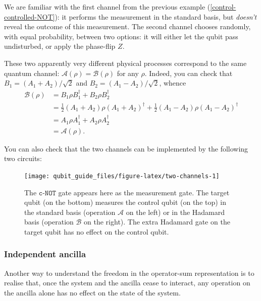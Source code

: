 \documentclass[fleqn,a4paper]{article}
\theoremstyle{definition}
\theoremstyle{definition}
\theoremstyle{definition}
\theoremstyle{definition}
\theoremstyle{remark}
\begin{document}
We are familiar with the first channel from the previous example (\ref{control-controlled-NOT}): it performs the measurement in the standard basis, but \emph{doesn't} reveal the outcome of this measurement.
The second channel chooses randomly, with equal probability, between two options: it will either let the qubit pass undisturbed, or apply the phase-flip \(Z\).

These two apparently very different physical processes correspond to the same quantum channel: \(\mathcal{A}(\rho)=\mathcal{B}(\rho)\) for any \(\rho\).
Indeed, you can check that \(B_1=(A_1+A_2)/\sqrt{2}\) and \(B_2=(A_1-A_2)/\sqrt{2}\), whence
\[
  \begin{aligned}
    \mathcal{B}(\rho)
    &= B_1\rho B_1^\dagger + B_2\rho B_2^\dagger
  \\&= \frac{1}{2} (A_1+A_2)\rho (A_1+A_2)^\dagger + \frac{1}{2} (A_1-A_2)\rho (A_1-A_2)^\dagger
  \\&=  A_1\rho A_1^\dagger + A_2\rho A_2^\dagger
  \\&= \mathcal{A}(\rho).
  \end{aligned}
\]

You can also check that the two channels can be implemented by the following two circuits:



\begin{figure}[H]

{\centering \texttt{[image: qubit\_guide\_files/figure-latex/two-channels-1]} 

}

\caption{The \(\texttt{c-NOT}\) gate appears here as the measurement gate. The target qubit (on the bottom) measures the control qubit (on the top) in the standard basis (operation \(\mathcal{A}\) on the left) or in the Hadamard basis (operation \(\mathcal{B}\) on the right). The extra Hadamard gate on the target qubit has no effect on the control qubit.}\label{fig:two-channels}
\end{figure}

\hypertarget{independent-ancilla}{%
\subsubsection{Independent ancilla}\label{independent-ancilla}}

Another way to understand the freedom in the operator-sum representation is to realise that, once the system and the ancilla cease to interact, any operation on the ancilla alone has no effect on the state of the system.
\end{document}
